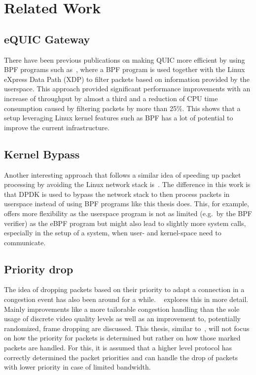 \section{Related Work}\label{sec:related_work}

\subsection{eQUIC Gateway}
There have been previous publications on making QUIC more efficient by using BPF programs
such as~\parencite{equic-gateway}, where a BPF program is used together with the Linux
eXpress Data Path (XDP) to filter packets based on information provided by the userspace.
This approach provided significant performance improvements with an increase of throughput
by almost a third and a reduction of CPU time consumption caused by filtering packets by
more than 25\%.
This shows that a setup leveraging Linux kernel features such as BPF has a lot of potential
to improve the current infrastructure.

\subsection{Kernel Bypass}
Another interesting approach that follows a similar idea of speeding up packet processing
by avoiding the Linux network stack is~\parencite{kernel-bypass-msc-thesis}.
The difference in this work is that DPDK is used to bypass the network stack to 
then process packets in userspace instead of using BPF programs like this thesis does.
This, for example, offers more flexibility as the userspace program is not as limited (e.g.\ 
by the BPF verifier) as the eBPF program but might also lead to slightly more system calls,
especially in the setup of a system, when user- and kernel-space need to communicate.

\subsection{Priority drop}
The idea of dropping packets based on their priority to adapt a connection
in a congestion event has also been around for a while.
~\parencite{media-streaming-prio-drop} explores this in more detail.
Mainly improvements like a more tailorable congestion handling than the sole usage
of discrete video quality levels as well as an improvement to, potentially 
randomized, frame dropping are discussed.
This thesis, similar to~\parencite{media-streaming-prio-drop}, will not focus
on how the priority for packets is determined but rather on how those marked
packets are handled.
For this, it is assumed that a higher level protocol has correctly determined 
the packet priorities and can handle the drop of packets with lower priority
in case of limited bandwidth.
